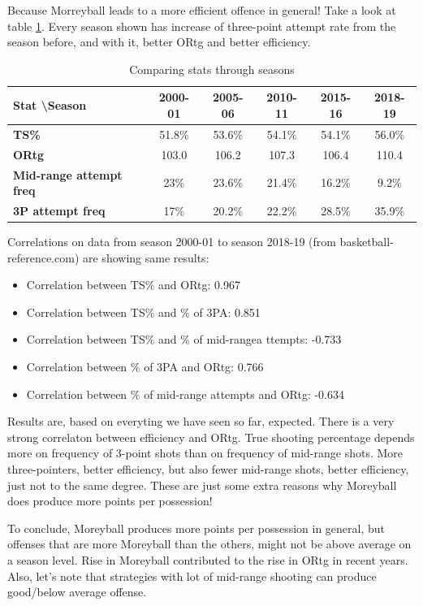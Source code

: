 \documentclass[a4paper]{article}
\begin{document}
Because Morreyball leads to a more efficient offence in general! Take a look at table \ref{tab:seasons_comp}. Every season shown has increase of three-point attempt rate from the season before, and with it, better ORtg and better efficiency.

\begin{table}[h!]
\begin{center}
\begin{tabular}{|l|c|c|c|c|c|} \hline
\textbf{Stat \textbackslash Season} & \textbf{2000-01} & \textbf{2005-06} & \textbf{2010-11} & \textbf{2015-16} & \textbf{2018-19} \\ \hline
\textbf{TS\%} & 51.8\% & 53.6\% & 54.1\% & 54.1\% & 56.0\% \\ \hline
\textbf{ORtg} & 103.0 & 106.2 & 107.3 & 106.4 & 110.4 \\ \hline
\textbf{Mid-range attempt freq} & 23\% & 23.6\% & 21.4\% & 16.2\% & 9.2\% \\ \hline
\textbf{3P attempt freq} & 17\% & 20.2\% & 22.2\% & 28.5\% & 35.9\% \\ \hline
\end{tabular}
\caption{Comparing stats through seasons}
\label{tab:seasons_comp}
\end{center}
\end{table}

Correlations on data from season 2000-01 to season 2018-19 (from basketball-reference.com) are showing same results:

\begin{itemize}
	\item Correlation between TS\% and ORtg: 0.967
	\item Correlation between TS\% and \% of 3PA: 0.851
	\item Correlation between TS\% and \% of mid-rangea ttempts: -0.733
	\item Correlation between \% of 3PA and ORtg: 0.766
	\item Correlation between \% of mid-range attempts and ORtg: -0.634
\end{itemize}

Results are, based on everyting we have seen so far, expected. There is a very strong correlaton between efficiency and ORtg. True shooting percentage depends more on frequency of 3-point shots than on frequency of mid-range shots. More three-pointers, better efficiency, but also fewer mid-range shots, better efficiency, just not to the same degree. These are just some extra reasons why Moreyball does produce more points per possession!

To conclude, Moreyball produces more points per possession in general, but offenses that are more Moreyball than the others, might not be above average on a season level. Rise in Moreyball contributed to the rise in ORtg in recent years. Also, let's note that strategies with lot of mid-range shooting can produce good/below average offense. %

\pagebreak

\appendix


\appendix
\end{document}
